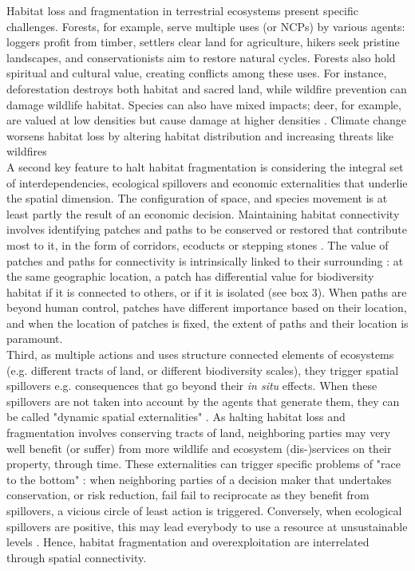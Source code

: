 Habitat loss and fragmentation in terrestrial ecosystems present specific challenges. Forests, for example, serve multiple uses (or NCPs) by various agents: loggers profit from timber, settlers clear land for agriculture, hikers seek pristine landscapes, and conservationists aim to restore natural cycles. Forests also hold spiritual and cultural value, creating conflicts among these uses. For instance, deforestation destroys both habitat and sacred land, while wildfire prevention can damage wildlife habitat. Species can also have mixed impacts; deer, for example, are valued at low densities but cause damage at higher densities \citep{putman_identifying_2011}. Climate change worsens habitat loss by altering habitat distribution and increasing threats like wildfires \citep{Dupuy2019ClimateCI,wasserman_climate_2023}\\
A second key feature to halt habitat fragmentation is considering the integral set of interdependencies, ecological spillovers and economic externalities that underlie the spatial dimension. The configuration of space, and species movement is at least partly the result of an economic decision. Maintaining habitat connectivity involves identifying patches and paths to be conserved or restored that contribute most to it, in the form of corridors, ecoducts or stepping stones \citep{Turner2005, Turner2011}. The value of patches and paths for connectivity is intrinsically linked to their surrounding : at the same geographic location, a patch has differential value for biodiversity habitat if it is connected to others, or if it is isolated (see box 3). When paths are beyond human control, patches have different importance based on their location, and when the location of patches is fixed, the extent of paths and their location is paramount.
\\
Third, as multiple actions and uses structure connected elements of ecosystems (e.g. different tracts of land, or different biodiversity scales), they trigger spatial spillovers e.g. consequences that go beyond their \textit{in situ} effects. When these spillovers are not taken into account by the agents that generate them, they can be called "dynamic spatial externalities" \citep{sanchirico_bioeconomics_1999, costello_optimal_2008, costello_private_2017}. As halting habitat loss and fragmentation involves conserving tracts of land, neighboring parties may very well benefit (or suffer) from more wildlife and ecosystem (dis-)services on their property, through time. These externalities can trigger specific problems of "race to the bottom" \citep{costello_private_2017} : when neighboring parties of a decision maker that undertakes conservation, or risk reduction, fail fail to reciprocate as they benefit from spillovers, a vicious circle of least action is triggered. Conversely, when ecological spillovers are positive, this may lead everybody to use a resource at unsustainable levels \citep{costello_optimal_2008}. Hence, habitat fragmentation and overexploitation are interrelated through spatial connectivity. 
